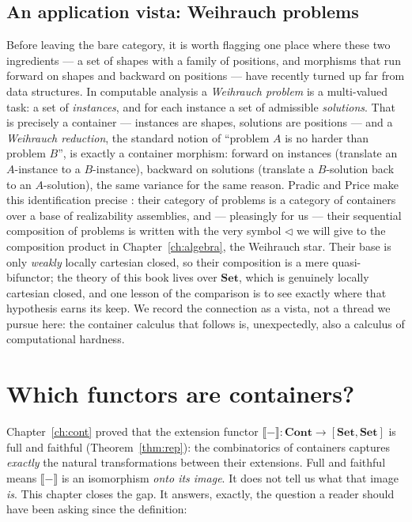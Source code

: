 \documentclass[11pt,a4paper]{book}
\newcommand{\Set}{\mathbf{Set}}
\newcommand{\Cont}{\mathbf{Cont}}
\newcommand{\Ext}[1]{\llbracket #1 \rrbracket}
\theoremstyle{plain}
\theoremstyle{definition}
\theoremstyle{remark}
\begin{document}
\section{An application vista: Weihrauch problems}
\label{sec:weihrauch}

Before leaving the bare category, it is worth flagging one place where these two
ingredients --- a set of shapes with a family of positions, and morphisms that run
forward on shapes and backward on positions --- have recently turned up far from
data structures. In computable analysis a \emph{Weihrauch problem} is a multi-valued
task: a set of \emph{instances}, and for each instance a set of admissible
\emph{solutions}. That is precisely a container --- instances are shapes, solutions
are positions --- and a \emph{Weihrauch reduction}, the standard notion of ``problem
$A$ is no harder than problem $B$'', is exactly a container morphism: forward on
instances (translate an $A$-instance to a $B$-instance), backward on solutions
(translate a $B$-solution back to an $A$-solution), the same variance for the same
reason. Pradic and Price make this identification precise \cite{PradicPrice}: their
category of problems is a category of containers over a base of realizability
assemblies, and --- pleasingly for us --- their sequential composition of problems is
written with the very symbol $\triangleleft$ we will give to the composition product
in Chapter~\ref{ch:algebra}, the Weihrauch star. Their base is only \emph{weakly}
locally cartesian closed, so their composition is a mere quasi-bifunctor; the theory
of this book lives over $\Set$, which is genuinely locally cartesian closed, and one
lesson of the comparison is to see exactly where that hypothesis earns its keep.
We record the connection as a vista, not a thread we pursue here: the container
calculus that follows is, unexpectedly, also a calculus of computational hardness.

\chapter{Which functors are containers?}
\label{ch:which}

Chapter~\ref{ch:cont} proved that the extension functor
$\Ext{-}\colon\Cont\to[\Set,\Set]$ is full and faithful
(Theorem~\ref{thm:rep}): the combinatorics of containers captures \emph{exactly}
the natural transformations between their extensions. Full and faithful means
$\Ext{-}$ is an isomorphism \emph{onto its image}. It does not tell us what that
image \emph{is}. This chapter closes the gap. It answers, exactly, the question a
reader should have been asking since the definition:
\end{document}
